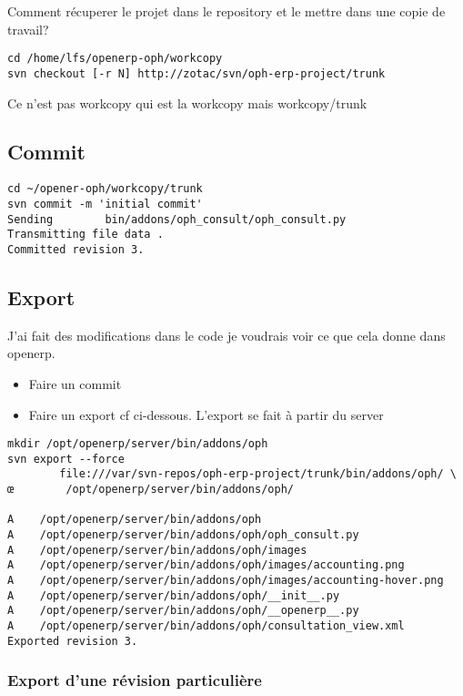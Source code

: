 \documentclass[12pt,a4paper]{article}
\begin{document}
Comment récuperer le projet dans le repository et le mettre dans une copie de travail? 

\begin{verbatim}
cd /home/lfs/openerp-oph/workcopy
svn checkout [-r N] http://zotac/svn/oph-erp-project/trunk
\end{verbatim}

Ce n'est pas workcopy qui est la workcopy mais workcopy/trunk\\

\subsection{Commit}
\label{sec:commit}
\begin{verbatim}
cd ~/opener-oph/workcopy/trunk
svn commit -m 'initial commit'
Sending        bin/addons/oph_consult/oph_consult.py
Transmitting file data .
Committed revision 3.
\end{verbatim}


\subsection{Export}
\label{sec:export}

J'ai fait des modifications dans le code je voudrais voir ce que cela donne dans openerp. 
\begin{itemize}
\item Faire un commit
\item Faire un export cf ci-dessous. L'export se fait à partir du server
\end{itemize}

\begin{verbatim}
mkdir /opt/openerp/server/bin/addons/oph
svn export --force 
        file:///var/svn-repos/oph-erp-project/trunk/bin/addons/oph/ \
œ        /opt/openerp/server/bin/addons/oph/

A    /opt/openerp/server/bin/addons/oph
A    /opt/openerp/server/bin/addons/oph/oph_consult.py
A    /opt/openerp/server/bin/addons/oph/images
A    /opt/openerp/server/bin/addons/oph/images/accounting.png
A    /opt/openerp/server/bin/addons/oph/images/accounting-hover.png
A    /opt/openerp/server/bin/addons/oph/__init__.py
A    /opt/openerp/server/bin/addons/oph/__openerp__.py
A    /opt/openerp/server/bin/addons/oph/consultation_view.xml
Exported revision 3.
\end{verbatim}

\subsubsection{Export d'une révision particulière}
\label{sec:export_rev}
\end{document}
